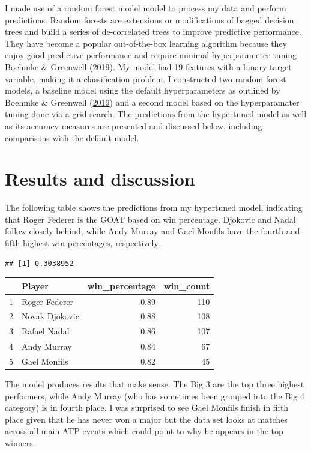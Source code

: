 \documentclass[11pt,preprint, authoryear]{elsarticle}
\let\origtable\table
\let\endorigtable\endtable
\renewenvironment{table}[1][2] {
    \expandafter\origtable\expandafter[H]
} {
    \endorigtable
}
\numberwithin{equation}{section}
\numberwithin{figure}{section}
\numberwithin{table}{section}
\begin{document}
I made use of a random forest model model to process my data and perform
predictions. Random forests are extensions or modifications of bagged
decision trees and build a series of de-correlated trees to improve
predictive performance. They have become a popular out-of-the-box
learning algorithm because they enjoy good predictive performance and
require minimal hyperparameter tuning Boehmke \& Greenwell
(\protect\hyperlink{ref-boehmke2019hands}{2019}). My model had 19
features with a binary target variable, making it a classification
problem. I constructed two random forest models, a baseline model using
the default hyperparameters as outlined by Boehmke \& Greenwell
(\protect\hyperlink{ref-boehmke2019hands}{2019}) and a second model
based on the hyperparamater tuning done via a grid search. The
predictions from the hypertuned model as well as its accuracy measures
are presented and discussed below, including comparisons with the
default model.

\hypertarget{results-and-discussion}{%
\section{Results and discussion}\label{results-and-discussion}}

The following table shows the predictions from my hypertuned model,
indicating that Roger Federer is the GOAT based on win percentage.
Djokovic and Nadal follow closely behind, while Andy Murray and Gael
Monfils have the fourth and fifth highest win percentages, respectively.

\begin{verbatim}
## [1] 0.3038952
\end{verbatim}

\begin{table}[ht]
\centering
\begin{tabular}{rlrr}
  \hline
 & Player & win\_percentage & win\_count \\ 
  \hline
1 & Roger Federer & 0.89 & 110 \\ 
  2 & Novak Djokovic & 0.88 & 108 \\ 
  3 & Rafael Nadal & 0.86 & 107 \\ 
  4 & Andy Murray & 0.84 &  67 \\ 
  5 & Gael Monfils & 0.82 &  45 \\ 
   \hline
\end{tabular}
\caption{The Best of Tennis} 
\end{table}

The model produces results that make sense. The Big 3 are the top three
highest performers, while Andy Murray (who has sometimes been grouped
into the Big 4 category) is in fourth place. I was surprised to see Gael
Monfils finish in fifth place given that he has never won a major but
the data set looks at matches across all main ATP events which could
point to why he appears in the top winners.
\end{document}
